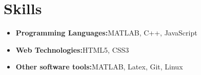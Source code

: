 \documentclass[a4paper,11pt]{article}
\newcommand{\resumeItem}[2]{
	\item{
		\textbf{#1}{\hspace{0.5mm}#2 \vspace{-0.5mm}}
	}
}
\newcommand{\resumeSubItem}[2]{\resumeItem{#1}{#2}\vspace{-4pt}}
\newcommand{\resumeHeadingSkillStart}{\begin{itemize}[leftmargin=*,itemsep=1.7mm, rightmargin=2ex]}
\newcommand{\resumeHeadingSkillEnd}{\end{itemize}\vspace{-2mm}}
\begin{document}
	\section{\textbf{Skills}}
	\vspace{-0.4mm}
	\resumeHeadingSkillStart
	\resumeSubItem{Programming Languages:}
	{MATLAB, C++, JavaScript}
	\resumeSubItem{Web Technologies:}
	{HTML5, CSS3}
	\resumeSubItem{Other software tools:}
	{MATLAB, Latex, Git, Linux}
	\resumeHeadingSkillEnd
	
\end{document}
